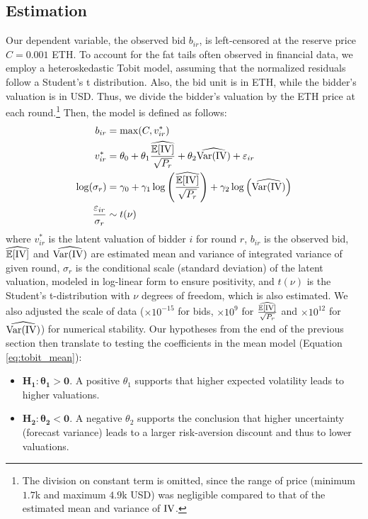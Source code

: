 \subsection{Estimation}
Our dependent variable, the observed bid $b_{ir}$, is left-censored at the reserve price $C = 0.001$ ETH. To account for the fat tails often observed in financial data, we employ a heteroskedastic Tobit model, assuming that the normalized residuals follow a Student's t distribution. Also, the bid unit is in ETH, while the bidder's valuation is in USD. Thus, we divide the bidder's valuation by the ETH price at each round.\footnote{The division on constant term is omitted, since the range of price (minimum $1.7$k and maximum $4.9$k USD) was negligible compared to that of the estimated mean and variance of \(\mathrm{IV}\).} Then, the model is defined as follows:
\begin{align}
    b_{ir} &= \max(C, v^*_{ir}) \label{eq:tobit_latent}\\
    v^*_{ir} &= \theta_0 + \theta_1 \frac{\widehat{\mathbb{E}[\mathrm{IV}]}}{\sqrt{P_r}} + \theta_2 \widehat{\mathrm{Var}(\mathrm{IV})} + \varepsilon_{ir} \label{eq:tobit_mean}\\
    \log(\sigma_r) &= \gamma_0 + \gamma_1 \log\left(\frac{\widehat{\mathbb{E}[\mathrm{IV}]}}{\sqrt{P_r}}\right) + \gamma_2 
    \log\left( \widehat{\mathrm{Var}(\mathrm{IV})} \right) \label{eq:tobit_scale} \\
    \frac{\varepsilon_{ir}}{\sigma_r} &\sim t(\nu)
\end{align}
where $v^*_{ir}$ is the latent valuation of bidder $i$ for round $r$, $b_{ir}$ is the observed bid, $\widehat{\mathbb{E}[\mathrm{IV}]}$ and $ \widehat{\mathrm{Var}(\mathrm{IV})}$ are estimated mean and variance of integrated variance of given round, $\sigma_r$ is the conditional scale (standard deviation) of the latent valuation, modeled in log-linear form to ensure positivity, and $t(\nu)$ is the Student's t-distribution with $\nu$ degrees of freedom, which is also estimated. We also adjusted the scale of data ($\times 10^{-15}$ for bids, $\times 10^9$ for $\frac{\widehat{\mathbb{E}[\mathrm{IV}]}}{\sqrt{P_r}}$ and $\times 10^{12}$ for $\widehat{\mathrm{Var}(\mathrm{IV})}$)  for numerical stability. Our hypotheses from the end of the previous section then translate to testing the coefficients in the mean model (Equation \ref{eq:tobit_mean}):
\begin{itemize}
    \item $\mathbf{H_1: \theta_1 > 0}$. A positive $\theta_1$ supports that higher expected volatility leads to higher valuations.
    \item $\mathbf{H_2: \theta_2 < 0}$. A negative $\theta_2$ supports the conclusion that higher uncertainty (forecast variance) leads to a larger risk-aversion discount and thus to lower valuations.
\end{itemize}

